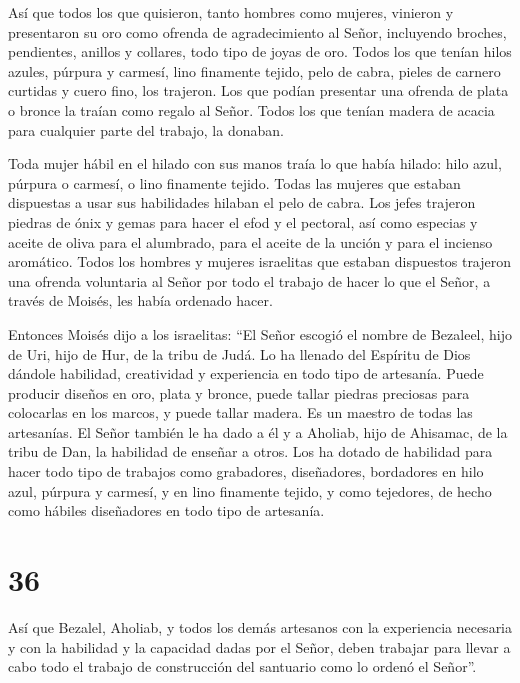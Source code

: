 Así que todos los que quisieron, tanto hombres como
mujeres, vinieron y presentaron su oro como ofrenda de agradecimiento al
Señor, incluyendo broches, pendientes, anillos y collares, todo tipo de
joyas de oro.  Todos los que tenían hilos azules, púrpura y
carmesí, lino finamente tejido, pelo de cabra, pieles de carnero
curtidas y cuero fino, los trajeron.  Los que podían
presentar una ofrenda de plata o bronce la traían como regalo al Señor.
Todos los que tenían madera de acacia para cualquier parte del trabajo,
la donaban.

 Toda mujer hábil en el hilado con sus manos traía lo que
había hilado: hilo azul, púrpura o carmesí, o lino finamente tejido.
 Todas las mujeres que estaban dispuestas a usar sus
habilidades hilaban el pelo de cabra.  Los jefes trajeron
piedras de ónix y gemas para hacer el efod y el pectoral, 
así como especias y aceite de oliva para el alumbrado, para el aceite de
la unción y para el incienso aromático.  Todos los hombres
y mujeres israelitas que estaban dispuestos trajeron una ofrenda
voluntaria al Señor por todo el trabajo de hacer lo que el Señor, a
través de Moisés, les había ordenado hacer.

 Entonces Moisés dijo a los israelitas: ``El Señor escogió
el nombre de Bezaleel, hijo de Uri, hijo de Hur, de la tribu de Judá.
 Lo ha llenado del Espíritu de Dios dándole habilidad,
creatividad y experiencia en todo tipo de artesanía.  Puede
producir diseños en oro, plata y bronce,  puede tallar
piedras preciosas para colocarlas en los marcos, y puede tallar madera.
Es un maestro de todas las artesanías.  El Señor también le
ha dado a él y a Aholiab, hijo de Ahisamac, de la tribu de Dan, la
habilidad de enseñar a otros.  Los ha dotado de habilidad
para hacer todo tipo de trabajos como grabadores, diseñadores,
bordadores en hilo azul, púrpura y carmesí, y en lino finamente tejido,
y como tejedores, de hecho como hábiles diseñadores en todo tipo de
artesanía.

\hypertarget{section-35}{%
\section{36}\label{section-35}}

 Así que Bezalel, Aholiab, y todos los demás artesanos con
la experiencia necesaria y con la habilidad y la capacidad dadas por el
Señor, deben trabajar para llevar a cabo todo el trabajo de construcción
del santuario como lo ordenó el Señor''.

